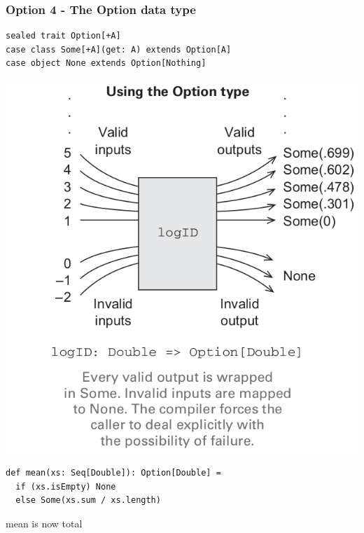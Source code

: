 \documentclass{beamer}
\begin{document}
\begin{frame}[fragile,t]
  \frametitle{Option 4 - The {\ttfamily Option} data type}
\begin{lstlisting}
sealed trait Option[+A]
case class Some[+A](get: A) extends Option[A]
case object None extends Option[Nothing]
\end{lstlisting}
\begin{center}
\includegraphics[scale=.15]{map-option.png}
\end{center}
\begin{lstlisting}
def mean(xs: Seq[Double]): Option[Double] =
  if (xs.isEmpty) None
  else Some(xs.sum / xs.length)
\end{lstlisting}
{\ttfamily mean} is now total
\end{frame}
\end{document}
